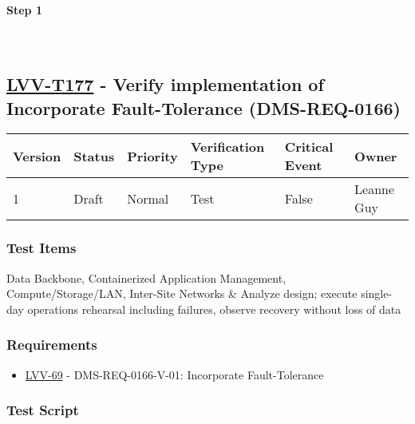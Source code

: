 \textbf{Step 1}\\
~\\
~\\

\hypertarget{lvv-t177---verify-implementation-of-incorporate-fault-tolerance-dms-req-0166}{%
\subsection{\texorpdfstring{\href{https://jira.lsstcorp.org/secure/Tests.jspa\#/testCase/LVV-T177}{LVV-T177}
- Verify implementation of Incorporate Fault-Tolerance
(DMS-REQ-0166)}{LVV-T177 - Verify implementation of Incorporate Fault-Tolerance (DMS-REQ-0166)}}\label{lvv-t177---verify-implementation-of-incorporate-fault-tolerance-dms-req-0166}}

\begin{longtable}[]{@{}llllll@{}}
\toprule
Version & Status & Priority & Verification Type & Critical Event &
Owner\tabularnewline
\midrule
\endhead
1 & Draft & Normal & Test & False & Leanne Guy\tabularnewline
\bottomrule
\end{longtable}

\hypertarget{test-items-77}{%
\subsubsection{Test Items}\label{test-items-77}}

Data Backbone, Containerized Application Management,
Compute/Storage/LAN, Inter-Site Networks \& Analyze design; execute
single-day operations rehearsal including failures, observe recovery
without loss of data

\hypertarget{requirements-77}{%
\subsubsection{Requirements}\label{requirements-77}}

\begin{itemize}
\tightlist
\item
  \href{https://jira.lsstcorp.org/browse/LVV-69}{LVV-69} -
  DMS-REQ-0166-V-01: Incorporate Fault-Tolerance
\end{itemize}

\hypertarget{test-script-77}{%
\subsubsection{Test Script}\label{test-script-77}}

